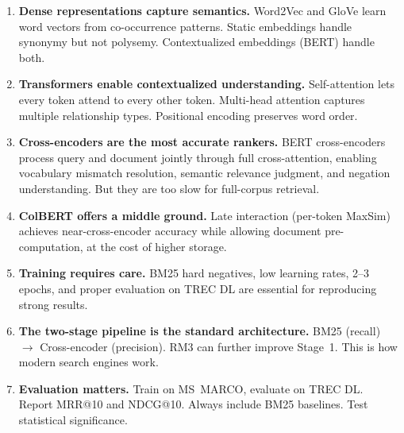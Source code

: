 \documentclass[11pt,a4paper]{article}
\theoremstyle{definition}
\theoremstyle{plain}
\begin{document}
\begin{enumerate}
    \item \textbf{Dense representations capture semantics.} Word2Vec and GloVe learn word vectors from co-occurrence patterns. Static embeddings handle synonymy but not polysemy. Contextualized embeddings (BERT) handle both.
    
    \item \textbf{Transformers enable contextualized understanding.} Self-attention lets every token attend to every other token. Multi-head attention captures multiple relationship types. Positional encoding preserves word order.
    
    \item \textbf{Cross-encoders are the most accurate rankers.} BERT cross-encoders process query and document jointly through full cross-attention, enabling vocabulary mismatch resolution, semantic relevance judgment, and negation understanding. But they are too slow for full-corpus retrieval.
    
    \item \textbf{ColBERT offers a middle ground.} Late interaction (per-token MaxSim) achieves near-cross-encoder accuracy while allowing document pre-computation, at the cost of higher storage.
    
    \item \textbf{Training requires care.} BM25 hard negatives, low learning rates, 2--3 epochs, and proper evaluation on TREC DL are essential for reproducing strong results.
    
    \item \textbf{The two-stage pipeline is the standard architecture.} BM25 (recall) $\to$ Cross-encoder (precision). RM3 can further improve Stage~1. This is how modern search engines work.
    
    \item \textbf{Evaluation matters.} Train on MS~MARCO, evaluate on TREC DL. Report MRR@10 and NDCG@10. Always include BM25 baselines. Test statistical significance.
\end{enumerate}




\end{document}
